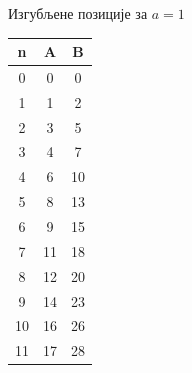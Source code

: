\documentclass[10pt]{beamer}
\begin{document}
	
	\begin{frame}{Изгубљене позиције за $ a = 1 $}
		\begin{center}
			\begin{minipage}[t]{.20\linewidth}
				\begin{table}[h!]
					\begin{center}
						\begin{tabular}{  c | c | c }
							{\textbf{n}} &  {\textbf{A}} &  {\textbf{B}} \\
							\hline
							0 & 0 & 0 \\
							1 & 1 & 2 \\
							2 & 3 & 5 \\
							3 & 4 & 7 \\
							4 & 6 & 10 \\
							5 & 8 & 13 \\
							6 & 9 & 15 \\
							7 & 11 & 18 \\
							8 & 12 & 20 \\
							9 & 14 & 23 \\
							10 & 16 & 26\\
							11 & 17 & 28\\ 
						\end{tabular}
					\end{center}
				\end{table}
			\end{minipage}%
			\begin{minipage}[t]{.80\linewidth}
				\vspace{0pt}
				\centering

\end{minipage}
\end{center}
\end{frame}
\end{document}

